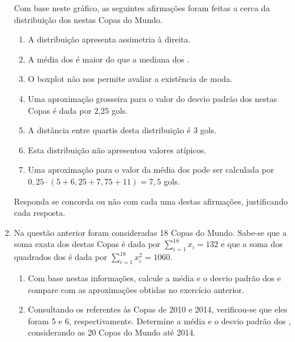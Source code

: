 \begin{enumerate}
Com base neste gráfico, as seguintes afirmações foram feitas a cerca da distribuição dos   nestas Copas do Mundo.
\begin{enumerate}
\item {} 
A distribuição apresenta assimetria à direita.

\item {} 
A média dos  é maior do que a mediana dos .

\item {} 
O boxplot não nos permite avaliar a existência de moda.

\item {} 
Uma aproximação grosseira para o valor do desvio padrão dos  nestas Copas é dada por 2,25 gols.

\item {} 
A distância entre quartis desta distribuição é 3 gols.

\item {} 
Esta distribuição não apresentou valores atípicos.

\item {} 
Uma aproximação para o valor da média dos  pode ser calculada por \(0,25\cdot (5+6,25+7,75+11)=7,5\) gols.

\end{enumerate}

Responda se concorda ou não com cada uma destas afirmações, justificando cada resposta.

\item Na questão anterior foram consideradas 18 Copas do Mundo. Sabe-se que a soma exata dos  destas Copas é dada por \(\displaystyle{\sum^{18}_{i=1}}x_i=132\) e que a soma dos quadrados dos  é dada por \(\displaystyle{\sum^{18}_{i=1}}x^2_i=1060\).
\begin{enumerate}
\item {} 
Com base nestas informações, calcule a média e o desvio padrão dos  e compare com as aproximações obtidas no exercício anterior.

\item {} 
Consultando os  referentes às Copas de 2010 e 2014, verificou-se que eles foram 5 e 6, respectivamente. Determine a média e o desvio padrão dos , considerando as 20 Copas do Mundo até 2014.


\end{enumerate}
\end{enumerate}
